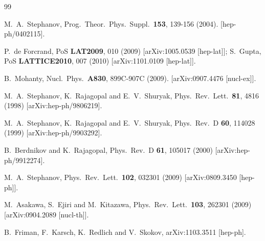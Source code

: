 \documentclass[prl,twocolumn,nofootinbib]{revtex4}
\begin{document}
\begin{thebibliography}{99}

  M.~A.~Stephanov,
  Prog.\ Theor.\ Phys.\ Suppl.\  {\bf 153}, 139-156 (2004).
  [hep-ph/0402115].


  P.~de Forcrand,
  PoS {\bf LAT2009}, 010 (2009)
  [arXiv:1005.0539 [hep-lat]];
  S.~Gupta,
  PoS {\bf LATTICE2010}, 007 (2010)
  [arXiv:1101.0109 [hep-lat]].


  B.~Mohanty,
  Nucl.\ Phys.\  {\bf A830}, 899C-907C (2009).
  [arXiv:0907.4476 [nucl-ex]].


  M.~A.~Stephanov, K.~Rajagopal and E.~V.~Shuryak,
  Phys.\ Rev.\ Lett.\  {\bf 81}, 4816 (1998)
  [arXiv:hep-ph/9806219].

  M.~A.~Stephanov, K.~Rajagopal and E.~V.~Shuryak,
  Phys.\ Rev.\  D {\bf 60}, 114028 (1999)
  [arXiv:hep-ph/9903292].

  B.~Berdnikov and K.~Rajagopal,
  Phys.\ Rev.\  D {\bf 61}, 105017 (2000)
  [arXiv:hep-ph/9912274].

  M.~A.~Stephanov,
  Phys.\ Rev.\ Lett.\  {\bf 102}, 032301 (2009)
  [arXiv:0809.3450 [hep-ph]].

  M.~Asakawa, S.~Ejiri and M.~Kitazawa,
  Phys.\ Rev.\ Lett.\  {\bf 103}, 262301 (2009)
  [arXiv:0904.2089 [nucl-th]].


  B.~Friman, F.~Karsch, K.~Redlich and V.~Skokov,
  arXiv:1103.3511 [hep-ph].


\end{thebibliography}
\end{document}
